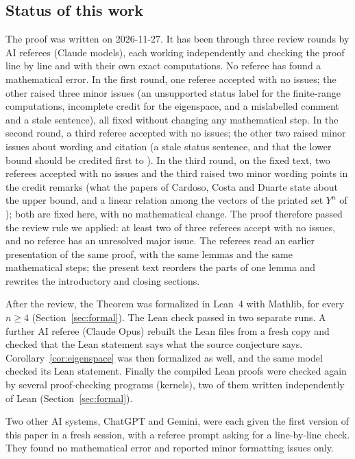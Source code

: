 \documentclass[11pt]{amsart}
\theoremstyle{plain}
\theoremstyle{definition}
\theoremstyle{remark}
\numberwithin{equation}{section}
\begin{document}
\subsection{Status of this work}
The proof was written on 2026-11-27. It has been through three review rounds by AI
referees (Claude models), each working independently and checking the proof line by line
and with their own exact computations. No referee has found a mathematical error. In the
first round, one referee accepted with no issues; the other raised three minor issues
(an unsupported status label for the finite-range computations, incomplete credit for
the eigenspace, and a mislabelled comment and a stale sentence), all fixed without
changing any mathematical step. In the second round, a third referee accepted with no
issues; the other two raised minor issues about wording and citation (a stale status
sentence, and that the lower bound should be credited first to \cite{CCD20}). In the third round, on the
fixed text, two referees accepted with no issues and the third raised two minor wording
points in the credit remarks (what the papers of Cardoso, Costa and Duarte state about the
upper bound, and a linear relation among the vectors of the printed set \(Y^n\) of
\cite{CCD20}); both are fixed here, with no mathematical change. The proof therefore passed
the review rule we applied: at least two of three referees accept with no issues, and no
referee has an unresolved major issue. The referees read an earlier presentation of the
same proof, with the same lemmas and the same mathematical steps; the present text
reorders the parts of one lemma and rewrites the introductory and closing sections.

After the review, the Theorem was formalized in Lean~4 with Mathlib, for every
\(n\ge4\) (Section~\ref{sec:formal}). The Lean check passed in two separate runs. A
further AI referee (Claude Opus) rebuilt the Lean files from a fresh copy and checked
that the Lean statement says what the source conjecture says. Corollary~\ref{cor:eigenspace}
was then formalized as well, and the same model checked its Lean statement. Finally the
compiled Lean proofs were checked again by several proof-checking programs (kernels),
two of them written independently of Lean (Section~\ref{sec:formal}).

Two other AI systems, ChatGPT and Gemini, were each given the first version of this
paper in a fresh session, with a referee prompt asking for a line-by-line check. They
found no mathematical error and reported minor formatting issues only.
\end{document}
